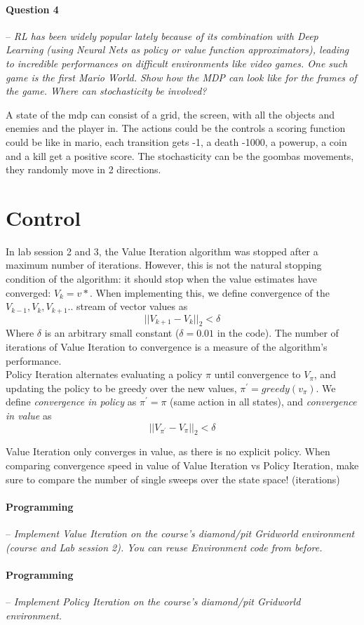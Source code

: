 \documentclass[a4paper]{article}
\newcommand{\question}[2]{
\paragraph{Question #1} -- \textit{#2}

}
\newcommand{\programming}[1]{
\paragraph{Programming} -- \textit{#1}

}
\begin{document}
\question{4}{RL has been widely popular lately because of its combination with Deep Learning (using Neural Nets as policy or value function approximators), leading to incredible performances on difficult environments like video games. One such game is the first Mario World. Show how the MDP can look like for the frames of the game. Where can stochasticity be involved?}

A state of the mdp can consist of a grid, the screen, with all the objects and enemies and the player in. The actions could be the controls a scoring function could be like in mario, each transition gets -1, a death -1000, a powerup, a coin and a kill get a positive score. The stochasticity can be the goombas movements, they randomly move in 2 directions.

\section{Control}
In lab session 2 and 3, the Value Iteration algorithm was stopped after a maximum number of iterations. However, this is not the natural stopping condition of the algorithm: it should stop when the value estimates have converged: $V_k = v*$. When implementing this, we define convergence of the $V_{k-1},V_k,V_{k+1}..$ stream of vector values as $$ \vert\vert V_{k+1} - V_k \vert\vert_2 < \delta $$
Where $\delta$ is an arbitrary small constant ($\delta = 0.01$ in the code). The number of iterations of Value Iteration to convergence is a measure of the algorithm's performance.\\

Policy Iteration alternates evaluating a policy $\pi$ until convergence to $V_\pi$, and updating the policy to be greedy over the new values, $\pi ^\prime = greedy(v_\pi)$. We define \textit{convergence in policy} as  $\pi^\prime = \pi$ (same action in all states), and \textit{convergence in value} as $$ \vert\vert V_{\pi ^\prime} - V_\pi \vert\vert_2 < \delta $$

Value Iteration only converges in value, as there is no explicit policy. When comparing convergence speed in value of Value Iteration vs Policy Iteration, make sure to compare the number of single sweeps over the state space! (iterations)

\programming{Implement Value Iteration on the course's diamond/pit Gridworld environment (course and Lab session 2). You can reuse Environment code from before.}

\programming{Implement Policy Iteration on the course's diamond/pit Gridworld environment.}
\end{document}
